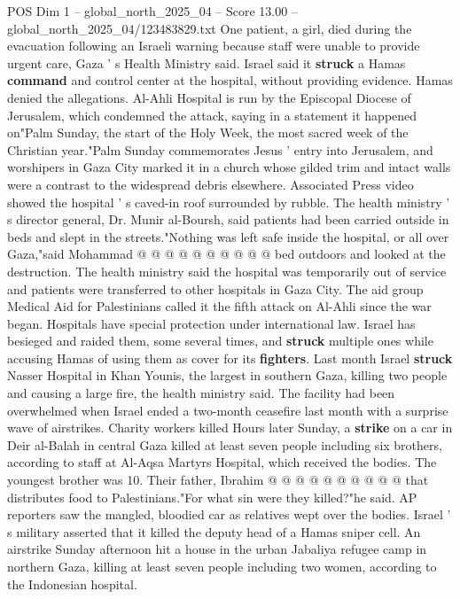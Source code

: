 \begin{textsample}{POS Dim 1 – global\_north\_2025\_04 – Score 13.00 – global\_north\_2025\_04/123483829.txt}  \label{ex:f1_pos_416}
One patient, a girl, died during the evacuation following an Israeli warning because staff were unable to provide urgent care, Gaza ' s Health Ministry said.
Israel said it \textbf{struck} a Hamas \textbf{command} and control center at the hospital, without providing evidence.
Hamas denied the allegations.
Al-Ahli Hospital is run by the Episcopal Diocese of Jerusalem, which condemned the attack, saying in a statement it happened on"Palm Sunday, the start of the Holy Week, the most sacred week of the Christian year."Palm Sunday commemorates Jesus ' entry into Jerusalem, and worshipers in Gaza City marked it in a church whose gilded trim and intact walls were a contrast to the widespread debris elsewhere.
Associated Press video showed the hospital ' s caved-in roof surrounded by rubble.
The health ministry ' s director general, Dr.
Munir al-Boursh, said patients had been carried outside in beds and slept in the streets."Nothing was left safe inside the hospital, or all over Gaza,"said Mohammad @ @ @ @ @ @ @ @ @ @ bed outdoors and looked at the destruction.
The health ministry said the hospital was temporarily out of service and patients were transferred to other hospitals in Gaza City.
The aid group Medical Aid for Palestinians called it the fifth attack on Al-Ahli since the war began.
Hospitals have special protection under international law.
Israel has besieged and raided them, some several times, and \textbf{struck} multiple ones while accusing Hamas of using them as cover for its \textbf{fighters}.
Last month Israel \textbf{struck} Nasser Hospital in Khan Younis, the largest in southern Gaza, killing two people and causing a large fire, the health ministry said.
The facility had been overwhelmed when Israel ended a two-month ceasefire last month with a surprise wave of airstrikes.
Charity workers killed Hours later Sunday, a \textbf{strike} on a car in Deir al-Balah in central Gaza killed at least seven people including six brothers, according to staff at Al-Aqsa Martyrs Hospital, which received the bodies.
The youngest brother was 10.
Their father, Ibrahim @ @ @ @ @ @ @ @ @ @ that distributes food to Palestinians."For what sin were they killed?"he said.
AP reporters saw the mangled, bloodied car as relatives wept over the bodies.
Israel ' s military asserted that it killed the deputy head of a Hamas sniper cell.
An airstrike Sunday afternoon hit a house in the urban Jabaliya refugee camp in northern Gaza, killing at least seven people including two women, according to the Indonesian hospital.

\end{textsample}
